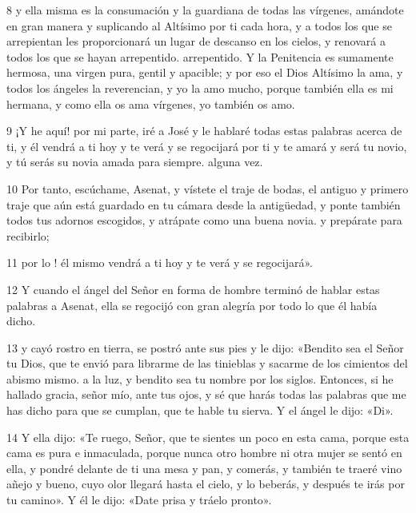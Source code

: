 \par 8 y ella misma es la consumación y la guardiana de todas las vírgenes, amándote en gran manera y suplicando al Altísimo por ti cada hora, y a todos los que se arrepientan les proporcionará un lugar de descanso en los cielos, y renovará a todos los que se hayan arrepentido. arrepentido. Y la Penitencia es sumamente hermosa, una virgen pura, gentil y apacible; y por eso el Dios Altísimo la ama, y ​​todos los ángeles la reverencian, y yo la amo mucho, porque también ella es mi hermana, y como ella os ama vírgenes, yo también os amo.

\par 9 ¡Y he aquí! por mi parte, iré a José y le hablaré todas estas palabras acerca de ti, y él vendrá a ti hoy y te verá y se regocijará por ti y te amará y será tu novio, y tú serás su novia amada para siempre. alguna vez.

\par 10 Por tanto, escúchame, Asenat, y vístete el traje de bodas, el antiguo y primero traje que aún está guardado en tu cámara desde la antigüedad, y ponte también todos tus adornos escogidos, y atrápate como una buena novia. y prepárate para recibirlo;

\par 11 por lo ! él mismo vendrá a ti hoy y te verá y se regocijará».

\par 12 Y cuando el ángel del Señor en forma de hombre terminó de hablar estas palabras a Asenat, ella se regocijó con gran alegría por todo lo que él había dicho.

\par 13 y cayó rostro en tierra, se postró ante sus pies y le dijo: «Bendito sea el Señor tu Dios, que te envió para librarme de las tinieblas y sacarme de los cimientos del abismo mismo. a la luz, y bendito sea tu nombre por los siglos. Entonces, si he hallado gracia, señor mío, ante tus ojos, y sé que harás todas las palabras que me has dicho para que se cumplan, que te hable tu sierva. Y el ángel le dijo: «Di».

\par 14 Y ella dijo: «Te ruego, Señor, que te sientes un poco en esta cama, porque esta cama es pura e inmaculada, porque nunca otro hombre ni otra mujer se sentó en ella, y pondré delante de ti una mesa y pan, y comerás, y también te traeré vino añejo y bueno, cuyo olor llegará hasta el cielo, y lo beberás, y después te irás por tu camino». Y él le dijo: «Date prisa y tráelo pronto».

